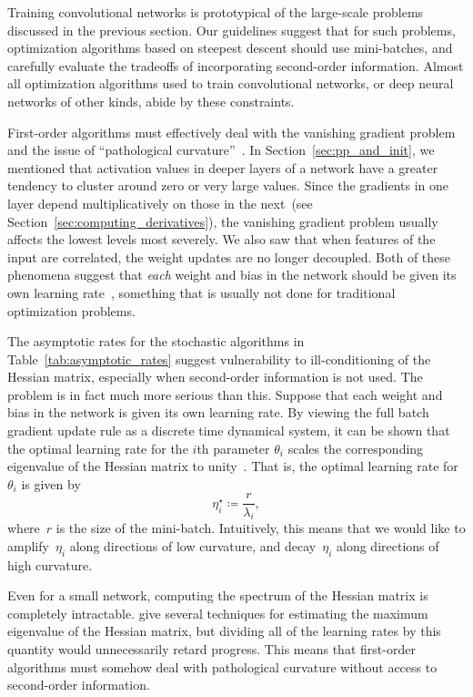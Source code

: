 \documentclass[11pt,a4paper]{article}
\numberwithin{equation}{section}
\begin{document}
Training convolutional networks is prototypical of the large-scale problems
discussed in the previous section. Our guidelines suggest that for such
problems, optimization algorithms based on steepest descent should use
mini-batches, and carefully evaluate the tradeoffs of incorporating second-order
information. Almost all optimization algorithms used to train convolutional
networks, or deep neural networks of other kinds, abide by these constraints.

First-order algorithms must effectively deal with the vanishing gradient problem
and the issue of ``pathological curvature''~\citep{martens2010deep}. In
Section~\ref{sec:pp_and_init}, we mentioned that activation values in deeper
layers of a network have a greater tendency to cluster around zero or very large
values. Since the gradients in one layer depend multiplicatively on those in the
next~(see Section~\ref{sec:computing_derivatives}), the vanishing gradient
problem usually affects the lowest levels most severely. We also saw that when
features of the input are correlated, the weight updates are no longer
decoupled. Both of these phenomena suggest that \emph{each} weight and bias in
the network should be given its own learning rate~\citep{lecun-98b}, something
that is usually not done for traditional optimization problems.

The asymptotic rates for the stochastic algorithms in
Table~\ref{tab:asymptotic_rates} suggest vulnerability to ill-conditioning of
the Hessian matrix, especially when second-order information is not used. The
problem is in fact much more serious than this. Suppose that each weight and
bias in the network is given its own learning rate. By viewing the full batch
gradient update rule as a discrete time dynamical system, it can be shown that
the optimal learning rate for the $i$th parameter $\theta_i$ scales the
corresponding eigenvalue of the Hessian matrix to unity~\citep{lecun-98b}. That
is, the optimal learning rate for $\theta_i$ is given by
\[
	\eta_i^\star \coloneqq \frac{r}{\lambda_i},
\]
where~$r$ is the size of the mini-batch. Intuitively, this means that we would
like to amplify~$\eta_i$ along directions of low curvature, and decay~$\eta_i$
along directions of high curvature.

Even for a small network, computing the spectrum of the Hessian matrix is
completely intractable. \citet{lecun-98b} give several techniques for estimating
the maximum eigenvalue of the Hessian matrix, but dividing all of the learning
rates by this quantity would unnecessarily retard progress. This means that
first-order algorithms must somehow deal with pathological curvature without
access to second-order information.
\end{document}
